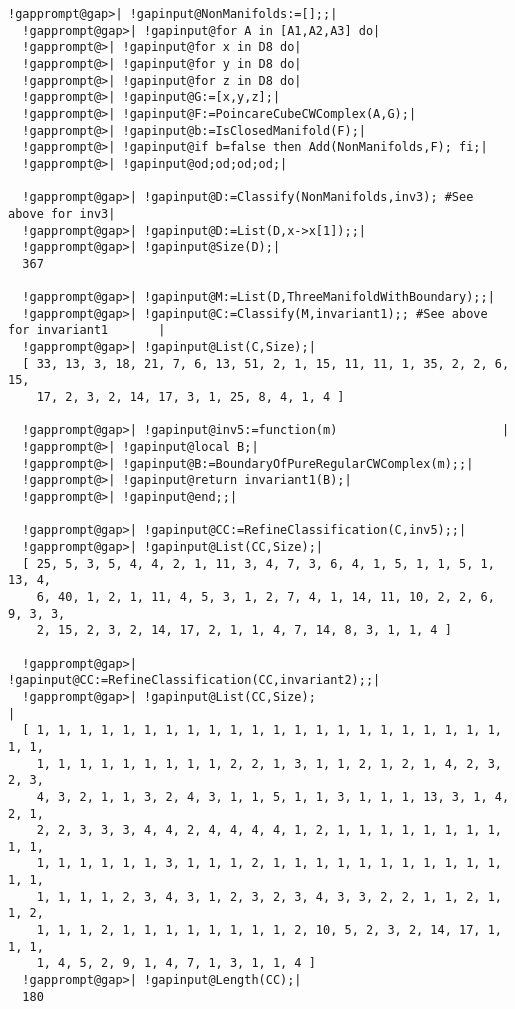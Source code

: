 \documentclass[a4paper,11pt]{report}
\begin{document}
{{\begin{Verbatim}[commandchars=!@|,fontsize=\small,frame=single,label=Example]
  !gapprompt@gap>| !gapinput@NonManifolds:=[];;|
  !gapprompt@gap>| !gapinput@for A in [A1,A2,A3] do|
  !gapprompt@>| !gapinput@for x in D8 do|
  !gapprompt@>| !gapinput@for y in D8 do|
  !gapprompt@>| !gapinput@for z in D8 do|
  !gapprompt@>| !gapinput@G:=[x,y,z];|
  !gapprompt@>| !gapinput@F:=PoincareCubeCWComplex(A,G);|
  !gapprompt@>| !gapinput@b:=IsClosedManifold(F);|
  !gapprompt@>| !gapinput@if b=false then Add(NonManifolds,F); fi;|
  !gapprompt@>| !gapinput@od;od;od;od;|
  
  !gapprompt@gap>| !gapinput@D:=Classify(NonManifolds,inv3); #See above for inv3|
  !gapprompt@gap>| !gapinput@D:=List(D,x->x[1]);;|
  !gapprompt@gap>| !gapinput@Size(D);|
  367
  
  !gapprompt@gap>| !gapinput@M:=List(D,ThreeManifoldWithBoundary);;|
  !gapprompt@gap>| !gapinput@C:=Classify(M,invariant1);; #See above for invariant1       |
  !gapprompt@gap>| !gapinput@List(C,Size);|
  [ 33, 13, 3, 18, 21, 7, 6, 13, 51, 2, 1, 15, 11, 11, 1, 35, 2, 2, 6, 15, 
    17, 2, 3, 2, 14, 17, 3, 1, 25, 8, 4, 1, 4 ]
  
  !gapprompt@gap>| !gapinput@inv5:=function(m)                       |
  !gapprompt@>| !gapinput@local B;|
  !gapprompt@>| !gapinput@B:=BoundaryOfPureRegularCWComplex(m);;|
  !gapprompt@>| !gapinput@return invariant1(B);|
  !gapprompt@>| !gapinput@end;;|
  
  !gapprompt@gap>| !gapinput@CC:=RefineClassification(C,inv5);;|
  !gapprompt@gap>| !gapinput@List(CC,Size);|
  [ 25, 5, 3, 5, 4, 4, 2, 1, 11, 3, 4, 7, 3, 6, 4, 1, 5, 1, 1, 5, 1, 13, 4, 
    6, 40, 1, 2, 1, 11, 4, 5, 3, 1, 2, 7, 4, 1, 14, 11, 10, 2, 2, 6, 9, 3, 3, 
    2, 15, 2, 3, 2, 14, 17, 2, 1, 1, 4, 7, 14, 8, 3, 1, 1, 4 ]
  
  !gapprompt@gap>| !gapinput@CC:=RefineClassification(CC,invariant2);;|
  !gapprompt@gap>| !gapinput@List(CC,Size);                              |
  [ 1, 1, 1, 1, 1, 1, 1, 1, 1, 1, 1, 1, 1, 1, 1, 1, 1, 1, 1, 1, 1, 1, 1, 1, 
    1, 1, 1, 1, 1, 1, 1, 1, 1, 2, 2, 1, 3, 1, 1, 2, 1, 2, 1, 4, 2, 3, 2, 3, 
    4, 3, 2, 1, 1, 3, 2, 4, 3, 1, 1, 5, 1, 1, 3, 1, 1, 1, 13, 3, 1, 4, 2, 1, 
    2, 2, 3, 3, 3, 4, 4, 2, 4, 4, 4, 4, 1, 2, 1, 1, 1, 1, 1, 1, 1, 1, 1, 1, 
    1, 1, 1, 1, 1, 1, 3, 1, 1, 1, 2, 1, 1, 1, 1, 1, 1, 1, 1, 1, 1, 1, 1, 1, 
    1, 1, 1, 1, 2, 3, 4, 3, 1, 2, 3, 2, 3, 4, 3, 3, 2, 2, 1, 1, 2, 1, 1, 2, 
    1, 1, 1, 2, 1, 1, 1, 1, 1, 1, 1, 1, 2, 10, 5, 2, 3, 2, 14, 17, 1, 1, 1, 
    1, 4, 5, 2, 9, 1, 4, 7, 1, 3, 1, 1, 4 ]
  !gapprompt@gap>| !gapinput@Length(CC);|
  180
  

\end{Verbatim}}}
\end{document}
